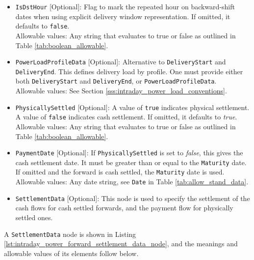\begin{itemize}
\item \lstinline!IsDstHour! [Optional]: Flag to mark the  repeated hour on backward-shift dates when using explicit delivery window representation. If omitted, it defaults to \lstinline!false!. \\
Allowable values: Any string that evaluates to true or false as outlined in Table \ref{tab:boolean_allowable}.

\item \lstinline!PowerLoadProfileData! [Optional]: Alternative to \lstinline!DeliveryStart! and \lstinline!DeliveryEnd!. This defines delivery load by profile. One must provide either both \lstinline!DeliveryStart! and \lstinline!DeliveryEnd!, or \lstinline!PowerLoadProfileData!. \\
Allowable values: See Section \ref{sss:intraday_power_load_conventions}.

\item \lstinline!PhysicallySettled! [Optional]: A value of \lstinline!true! indicates physical settlement. A value of \lstinline!false! indicates cash settlement. If omitted, it defaults to \emph{true}. \\
Allowable values: Any string that evaluates to true or false as outlined in Table \ref{tab:boolean_allowable}.

\item \lstinline!PaymentDate! [Optional]: If \lstinline!PhysicallySettled! is set to \emph{false}, this gives the cash settlement date. It must be greater than or equal to the \lstinline!Maturity! date. If omitted and the forward is cash settled, the \lstinline!Maturity! date is used. \\
Allowable values: Any date string, see \lstinline!Date! in Table \ref{tab:allow_stand_data}.

\item \lstinline!SettlementData! [Optional]: This node is used to specify the settlement of the cash flows for cash settled forwards, and the payment flow for physically settled ones.
\end{itemize}

A \lstinline!SettlementData! node is shown in Listing \ref{lst:intraday_power_forward_settlement_data_node}, and the meanings and allowable values of its elements follow below.

